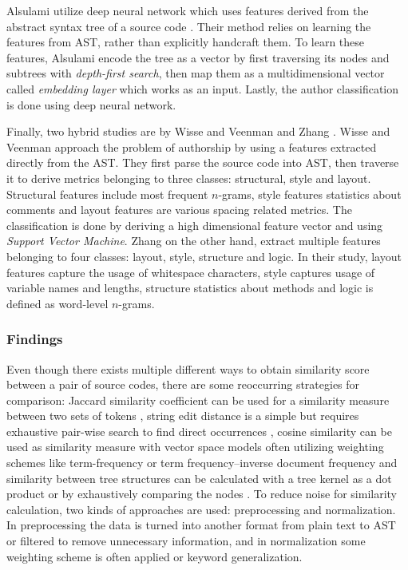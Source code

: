 Alsulami \etal utilize deep neural network which uses features derived from the abstract syntax tree of a source code \cite{SCAANN2017}. Their method relies on learning the features from AST, rather than explicitly handcraft them. To learn these features, Alsulami \etal encode the tree as a vector by first traversing its nodes and subtrees with \emph{depth-first search}, then map them as a multidimensional vector called \emph{embedding layer} which works as an input. Lastly, the author classification is done using deep neural network. 

Finally, two hybrid studies are by Wisse and Veenman \cite{SDNAIJSP2015} and Zhang \etal \cite{AISC2017}. Wisse and Veenman approach the problem of authorship by using a features extracted directly from the AST. They first parse the source code into AST, then traverse it to derive metrics belonging to three classes: structural, style and layout. Structural features include most frequent $n$-grams, style features statistics about comments and layout features are various spacing related metrics. The classification is done by deriving a high dimensional feature vector and using \emph{Support Vector Machine}. Zhang \etal on the other hand, extract multiple features belonging to four classes: layout, style, structure and logic. In their study, layout features capture the usage of whitespace characters, style captures usage of variable names and lengths, structure statistics about methods and logic is defined as word-level $n$-grams.

\subsubsection{Findings}
Even though there exists multiple different ways to obtain similarity score between a pair of source codes, there are some reoccurring strategies for comparison: Jaccard similarity coefficient can be used for a similarity measure between two sets of tokens \cite{PACASCD2005, BUAA2009, OTIOLSS2015, ramirez2015high}, string edit distance is a simple but requires exhaustive pair-wise search to find direct occurrences \cite{LICD2010, ASTMLPD2013, CPDPPD2013}, cosine similarity can be used as similarity measure with vector space models often utilizing weighting schemes like term-frequency or term frequency–inverse document frequency \cite{AASCPD2012, USCR2014, Heblikar2015NormalizationBS, OTIOLSS2015, ramirez2015high} and similarity between tree structures can be calculated with a tree kernel as a dot product or by exhaustively comparing the nodes \cite{AAPSCDPTK2013, Fu2017WASTKAW, TBCFPD2012}. To reduce noise for similarity calculation, two kinds of approaches are used: preprocessing and normalization. In preprocessing the data is turned into another format \eg from plain text to AST or filtered to remove unnecessary information, and in normalization some weighting scheme is often applied or keyword generalization.

